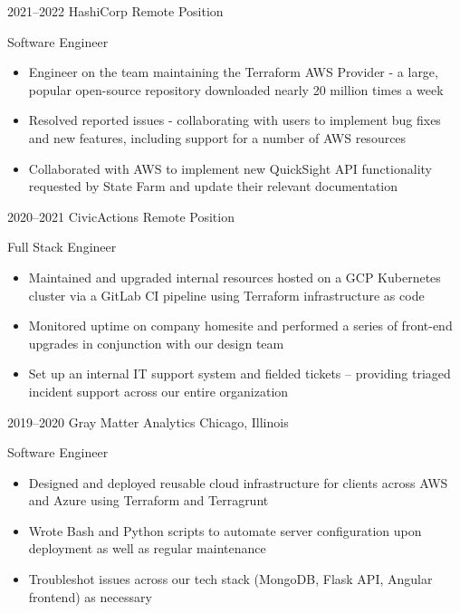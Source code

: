 \documentclass[letterpaper]{friggeri-cv} %
\begin{document}
\begin{entrylist}


\entry
{2021--2022}
{HashiCorp}
{Remote Position}
{{Software Engineer}
\begin{itemize}
\item Engineer on the team maintaining the Terraform AWS Provider - a large, popular open-source repository downloaded nearly 20 million times a week
\item Resolved reported issues - collaborating with users to implement bug fixes and new features, including support for a number of AWS resources
\item Collaborated with AWS to implement new QuickSight API functionality requested by State Farm and update their relevant documentation
\end{itemize}}


\entry
{2020--2021}
{CivicActions}
{Remote Position}
{{Full Stack Engineer}
\begin{itemize}
\item Maintained and upgraded internal resources hosted on a GCP Kubernetes cluster via a GitLab CI pipeline using Terraform infrastructure as code
\item Monitored uptime on company homesite and performed a series of front-end upgrades in conjunction with our design team
\item Set up an internal IT support system and fielded tickets -- providing triaged incident support across our entire organization
\end{itemize}}


\entry
{2019--2020}
{Gray Matter Analytics}
{Chicago, Illinois}
{{Software Engineer}
\begin{itemize}
\item Designed and deployed reusable cloud infrastructure for clients across AWS and Azure using Terraform and Terragrunt
\item Wrote Bash and Python scripts to automate server configuration upon deployment as well as regular maintenance
\item Troubleshot issues across our tech stack (MongoDB, Flask API, Angular frontend) as necessary
\end{itemize}}



\end{entrylist}
\end{document}
